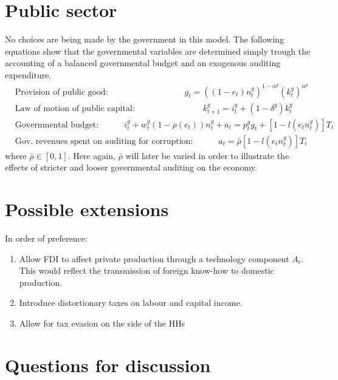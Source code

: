 \documentclass[]{scrartcl}
\begin{document}
\section{Public sector}
No choices are being made by the government in this model. The following equations show that the governmental variables are determined simply trough the accounting of a balanced governmental budget and an exogenous auditing expenditure.
\begin{align}
&\text{Provision of public good:}\qquad\qquad\qquad\qquad\quad g_t=\left( (1-e_t)n_t^g \right)^{1-\alpha^g}\left( k_t^g \right)^{\alpha^g}\\
&\text{Law of motion of public capital:}\qquad\qquad\qquad\qquad  k_{t+1}^g= i^g_t+(1-\delta^g)k_t^g\\
&\text{Governmental budget:}\qquad\quad i^g_t+w^g_t (1-\rho(e_t))n^g_t+a_t= p^g_tg_t+\left[ 1-l\left( e_tn_t^g \right) \right]T_t\\
&\text{Gov. revenues spent on auditing for corruption:}\quad\qquad  a_t= \bar{\rho}\left[ 1-l\left( e_tn_t^g \right) \right]T_t
\end{align}
where $  \bar{\rho} \in [0,1] $. Here again, $ \bar{\rho} $ will later be varied in order to illustrate the effects of stricter and looser governmental auditing on the economy.

\section{Possible extensions}
In order of preference:
\begin{enumerate}
\item Allow FDI to affect private production through a technology component $ A_t $. This would reflect the transmission of foreign know-how to domestic production.
\item Introduce distortionary taxes on labour and capital income.
\item Allow for tax evasion on the side of the HHs
\end{enumerate}

\section{Questions for discussion}
\end{document}

